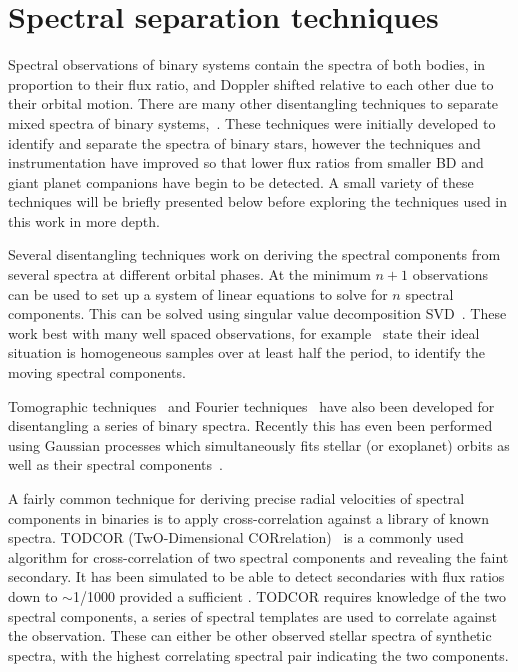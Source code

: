 
\section{Spectral separation techniques}
\label{sec:disentangling_techniques}

Spectral observations of binary systems contain the spectra of both bodies, in proportion to their flux ratio, and Doppler shifted relative to each other due to their orbital motion.
There are many other disentangling techniques to separate mixed spectra of binary systems,~\citep[e.g.][and references therein]{hadrava_disentangling_2009}.
These techniques were initially developed to identify and separate the spectra of binary stars, however the techniques and instrumentation have improved so that lower flux ratios from smaller BD and giant planet companions have begin to be detected.
A small variety of these techniques will be briefly presented below before exploring the techniques used in this work in more depth.

Several disentangling techniques work on deriving the spectral components from several spectra at different orbital phases.
At the minimum \(n+1\) observations can be used to set up a system of linear equations to solve for \(n\) spectral components. This can be solved using singular value decomposition {SVD}~\citep[e.g.][]{simon_disentangling_1994, sablowski_spectral_2016}.
These work best with many well spaced observations, for example~\citet{sablowski_spectral_2016} state their ideal situation is homogeneous samples over at least half the period, to identify the moving spectral components.

Tomographic techniques~\citep[e.g.][]{bagnuolo_tomographic_1991} and Fourier techniques~\citep{hadrava_orbital_1995} have also been developed for disentangling a series of binary spectra.
Recently this has even been performed using Gaussian processes which simultaneously fits stellar (or exoplanet) orbits as well as their spectral components~\citet{czekala_disentangling_2017}.

A fairly common technique for deriving precise radial velocities of spectral components in binaries is to apply cross-correlation against a library of known spectra.
TODCOR (TwO-Dimensional CORrelation)~\citep{zucker_study_1994} is a commonly used algorithm for cross-correlation of two spectral components and revealing the faint secondary. It has been simulated to be able to detect secondaries with flux ratios down to \(\sim\)1/1000 provided a sufficient \snr{}\citep[e.g.][]{mazeh_todcor_1994,mazeh_detecting_1997}.
TODCOR requires knowledge of the two spectral components, a series of spectral templates are used to correlate against the observation. These can either be other observed stellar spectra of synthetic spectra, with the highest correlating spectral pair indicating the two components.

